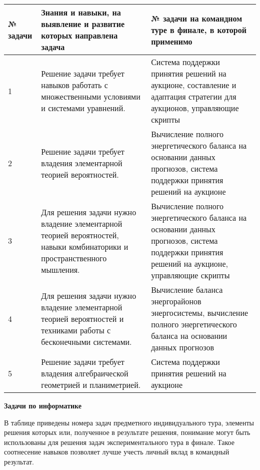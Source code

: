 \begin{center}
\small
\begin{longtable}{|p{2cm}|p{6cm}|p{7cm}|}
\hline
\textbf{№ задачи}&\textbf{Знания и навыки, на выявление и развитие которых направлена задача}&\textbf{№ задачи на командном туре в финале, в которой применимо}\\
\hline
1& Решение задачи требует навыков работать с множественными условиями и системами уравнений.& Система поддержки принятия решений на аукционе, составление и адаптация стратегии для аукционов, управляющие скрипты\\
\hline
2& Решение задачи требует владения элементарной теорией вероятностей.& Вычисление полного энергетического баланса на основании данных прогнозов, система поддержки принятия решений на аукционе\\
\hline
3& Для решения задачи нужно владение элементарной теорией вероятностей, навыки комбинаторики и пространственного мышления.& Вычисление полного энергетического баланса на основании данных прогнозов, система поддержки принятия решений на аукционе, управляющие скрипты\\
\hline
4& Для решения задачи нужно владение элементарной теорией вероятностей и техниками работы с бесконечными системами.& Вычисление баланса энергорайонов энергосистемы, вычисление полного энергетического баланса на основании данных прогнозов\\
\hline
5& Решение задачи требует владения алгебраической геометрией и планиметрией.& Система поддержки принятия решений на аукционе \\
\hline
\end{longtable}
\end{center}

\textbf{Задачи по информатике}

В таблице приведены номера задач предметного индивидуального тура, элементы решения которых или, полученное в результате решения, понимание могут быть использованы для решения задач экспериментального тура в финале. Такое соотнесение навыков позволяет лучше учесть личный вклад в командный результат.

